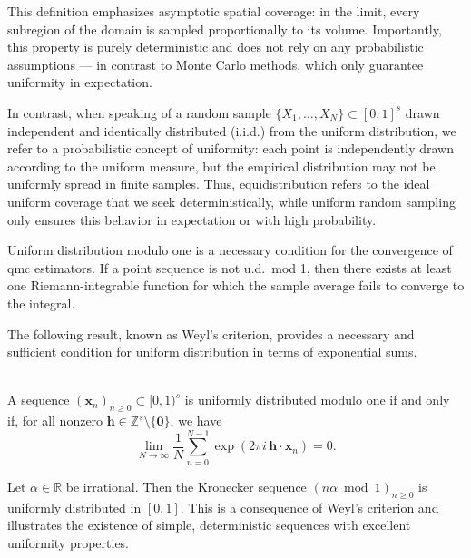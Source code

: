 This definition emphasizes asymptotic spatial coverage: in the limit, every
subregion of the domain is sampled proportionally to its volume. Importantly,
this property is purely deterministic and does not rely on any probabilistic
assumptions — in contrast to Monte Carlo methods, which only guarantee
uniformity in expectation.

In contrast, when speaking of a random sample $\{X_1, \dots, X_N\} \subset
[0,1]^s$ drawn independent and identically distributed (i.i.d.) from the uniform
distribution, we refer to a probabilistic concept of uniformity: each point is
independently drawn according to the uniform measure, but the empirical
distribution may not be uniformly spread in finite samples. Thus,
equidistribution refers to the ideal uniform coverage that we seek
deterministically, while uniform random sampling only ensures this behavior in
expectation or with high probability.

\begin{remark}
    Uniform distribution modulo one is a necessary condition for the convergence
    of \ac{qmc} estimators. If a point sequence is not u.d.\ mod 1, then there
    exists at least one Riemann-integrable function for which the sample average
    fails to converge to the integral.
\end{remark}

The following result, known as Weyl’s criterion, provides a necessary and
sufficient condition for uniform distribution in terms of exponential sums.

\begin{theorem} \ \\
A sequence $(\boldsymbol{x}_n)_{n \geq 0} \subset [0,1)^s$ is uniformly distributed modulo one if and only if, for all nonzero $\boldsymbol{h} \in \mathbb{Z}^s \setminus \{\boldsymbol{0}\}$, we have
\begin{equation*}
    \lim_{N \to \infty} \frac{1}{N} \sum_{n=0}^{N-1} \exp(2\pi i\, \boldsymbol{h} \cdot \boldsymbol{x}_n) = 0.
\end{equation*}
\end{theorem}

\begin{example}
Let $\alpha \in \mathbb{R}$ be irrational. Then the Kronecker sequence $(n \alpha \bmod 1)_{n \geq 0}$ is uniformly distributed in $[0,1]$. This is a consequence of Weyl’s criterion and illustrates the existence of simple, deterministic sequences with excellent uniformity properties.
\end{example}

